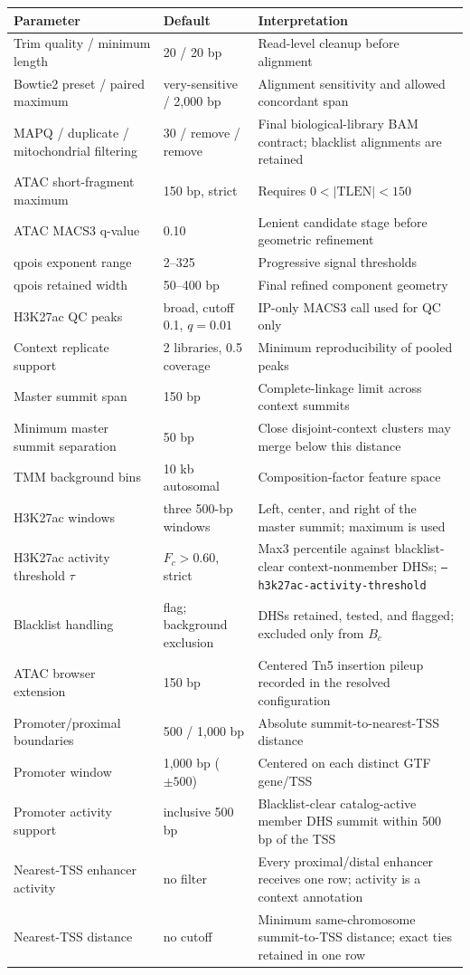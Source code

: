 \documentclass[11pt]{article}
\begin{document}
\begin{longtable}{L{0.31\textwidth} L{0.21\textwidth} L{0.39\textwidth}}
\toprule
Parameter & Default & Interpretation \\
\midrule
\endhead
Trim quality / minimum length & 20 / 20 bp & Read-level cleanup before alignment \\
Bowtie2 preset / paired maximum & very-sensitive / 2,000 bp & Alignment sensitivity and allowed concordant span \\
MAPQ / duplicate / mitochondrial filtering & 30 / remove / remove & Final biological-library BAM contract; blacklist alignments are retained \\
ATAC short-fragment maximum & 150 bp, strict & Requires \(0<|\mathrm{TLEN}|<150\) \\
ATAC MACS3 q-value & 0.10 & Lenient candidate stage before geometric refinement \\
qpois exponent range & 2--325 & Progressive signal thresholds \\
qpois retained width & 50--400 bp & Final refined component geometry \\
H3K27ac QC peaks & broad, cutoff 0.1, \(q=0.01\) & IP-only MACS3 call used for QC only \\
Context replicate support & 2 libraries, 0.5 coverage & Minimum reproducibility of pooled peaks \\
Master summit span & 150 bp & Complete-linkage limit across context summits \\
Minimum master summit separation & 50 bp & Close disjoint-context clusters may merge below this distance \\
TMM background bins & 10 kb autosomal & Composition-factor feature space \\
H3K27ac windows & three 500-bp windows & Left, center, and right of the master summit; maximum is used \\
H3K27ac activity threshold \(\tau\) & \(F_c>0.60\), strict & Max3 percentile against blacklist-clear context-nonmember DHSs; \texttt{--h3k27ac-activity-threshold} \\
Blacklist handling & flag; background exclusion & DHSs retained, tested, and flagged; excluded only from \(B_c\) \\
ATAC browser extension & 150 bp & Centered Tn5 insertion pileup recorded in the resolved configuration \\
Promoter/proximal boundaries & 500 / 1,000 bp & Absolute summit-to-nearest-TSS distance \\
Promoter window & 1,000 bp (\(\pm500\)) & Centered on each distinct GTF gene/TSS \\
Promoter activity support & inclusive 500 bp & Blacklist-clear catalog-active member DHS summit within 500 bp of the TSS \\
Nearest-TSS enhancer activity & no filter & Every proximal/distal enhancer receives one row; activity is a context annotation \\
Nearest-TSS distance & no cutoff & Minimum same-chromosome summit-to-TSS distance; exact ties retained in one row \\
\bottomrule
\end{longtable}
\end{document}
